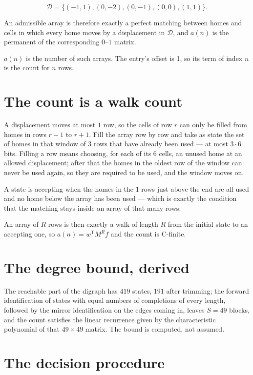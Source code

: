 \documentclass[11pt]{article}
\theoremstyle{definition}
\begin{document}
\[\mathcal{D} = \{(-1,1), (0,-2), (0,-1), (0,0), (1,1)\}.\]

An admissible array is therefore exactly a perfect matching between homes and cells in which every home moves by a displacement in $\mathcal{D}$, and $a(n)$ is the permanent of the corresponding $0$--$1$ matrix.

$a(n)$ is the number of such arrays. The entry's offset is 1, so its term of index $n$ is the count for $n$ rows.

\section{The count is a walk count}

A displacement moves at most $1$ row, so the cells of row $r$ can only be filled from homes in rows $r-1$ to $r+1$. Fill the array row by row and take as state the set of homes in that window of $3$ rows that have already been used --- at most $3\cdot6$ bits. Filling a row means choosing, for each of its $6$ cells, an unused home at an allowed displacement; after that the homes in the oldest row of the window can never be used again, so they are required to be used, and the window moves on.

A state is accepting when the homes in the $1$ rows just above the end are all used and no home below the array has been used --- which is exactly the condition that the matching stays inside an array of that many rows.

An array of $R$ rows is then exactly a walk of length $R$ from the initial state to an accepting one, so $a(n) = w^{\mathsf T}M^{R}f$ and the count is C-finite.

\section{The degree bound, derived}

The reachable part of the digraph has $419$ states, $191$ after trimming; the forward identification of states with equal numbers of completions of every length, followed by the mirror identification on the edges coming in, leaves $S = 49$ blocks, and the count satisfies the linear recurrence given by the characteristic polynomial of that $49\times49$ matrix. The bound is computed, not assumed.

\section{The decision procedure}
\end{document}
